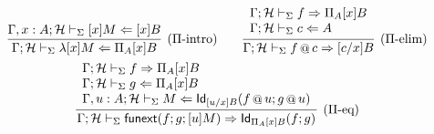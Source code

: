 \documentclass{amsart}
\begin{document}
\begin{gather*}
  \infer[\text{($\Pi$-intro)}]{
    \Gamma;\mathcal{H}\vdash_\Sigma\lambda [x]M\checks\Pi_A[x]B
  }{
    \Gamma,x:A;\mathcal{H}\vdash_\Sigma [x]M\checks[x]B
  }\qquad
  \infer[\text{($\Pi$-elim)}]{
    \Gamma;\mathcal{H}\vdash_\Sigma f\mathop{@}c \infers [c/x]B
  }{
    \begin{array}{l}
      \Gamma;\mathcal{H}\vdash_\Sigma f\infers\Pi_A[x]B\\
      \Gamma;\mathcal{H}\vdash_\Sigma c\checks A
    \end{array}
  }
  \\
  \infer[\text{($\Pi$-eq)}]{
    \Gamma;\mathcal{H}\vdash_\Sigma \mathsf{funext}(f; g; [u]M)\infers \mathsf{Id}_{\Pi_A[x]B}(f; g)
  }{
    \begin{array}{l}
      \Gamma;\mathcal{H}\vdash_\Sigma f\infers \Pi_A[x]B\\
      \Gamma;\mathcal{H}\vdash_\Sigma g\checks \Pi_A[x]B\\
      \Gamma,u:A;\mathcal{H}\vdash_\Sigma M\checks \mathsf{Id}_{[u/x]B}(f\mathop{@}u;g\mathop{@}u)
    \end{array}
  }
\end{gather*}
\end{document}
